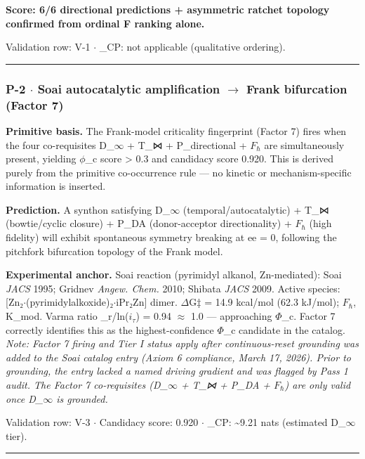 \documentclass[12pt,a4paper]{article}
\begin{document}
\textbf{Score: 6/6 directional predictions + asymmetric ratchet topology confirmed from ordinal F ranking alone.}

Validation row: V-1 $\cdot$ \xi\_CP: not applicable (qualitative ordering).

\begin{center}
\rule{0.5\textwidth}{0.4pt}
\end{center}

\subsubsection{P-2 $\cdot$ Soai autocatalytic amplification $\rightarrow$ Frank bifurcation (Factor 7)}

\textbf{Primitive basis.} The Frank-model criticality fingerprint (Factor 7) fires when the four co-requisites D\_$\infty$ + T\_⋈ + P\_directional + $F_{\hbar}$ are simultaneously present, yielding $\phi$\_c score \textgreater{} 0.3 and candidacy score 0.920. This is derived purely from the primitive co-occurrence rule --- no kinetic or mechanism-specific information is inserted.

\textbf{Prediction.} A synthon satisfying D\_$\infty$ (temporal/autocatalytic) + T\_⋈ (bowtie/cyclic closure) + P\_DA (donor-acceptor directionality) + $F_{\hbar}$ (high fidelity) will exhibit spontaneous symmetry breaking at ee = 0, following the pitchfork bifurcation topology of the Frank model.

\textbf{Experimental anchor.} Soai reaction (pyrimidyl alkanol, Zn-mediated): Soai \emph{JACS} 1995; Gridnev \emph{Angew. Chem.} 2010; Shibata \emph{JACS} 2009.
Active species: {[}Zn₂$\cdot$(pyrimidylalkoxide)₂$\cdot$iPr₂Zn{]} dimer. $\Delta$G‡ = 14.9 kcal/mol (62.3 kJ/mol); $F_{\hbar}$, K\_mod.
Varma ratio \xi\_r/ln(\x$i_{\tau}$) = 0.94 $\approx$ 1.0 --- approaching $\Phi$\_c. Factor 7 correctly identifies this as the highest-confidence $\Phi$\_c candidate in the catalog. \emph{Note: Factor 7 firing and Tier I status apply after continuous-reset grounding was added to the Soai catalog entry (Axiom 6 compliance, March 17, 2026). Prior to grounding, the entry lacked a named driving gradient and was flagged by Pass 1 audit. The Factor 7 co-requisites (D\_$\infty$ + T\_⋈ + P\_DA + $F_{\hbar}$) are only valid once D\_$\infty$ is grounded.}

Validation row: V-3 $\cdot$ Candidacy score: 0.920 $\cdot$ \xi\_CP: \textasciitilde{}9.21 nats (estimated D\_$\infty$ tier).

\begin{center}
\rule{0.5\textwidth}{0.4pt}
\end{center}
\end{document}

